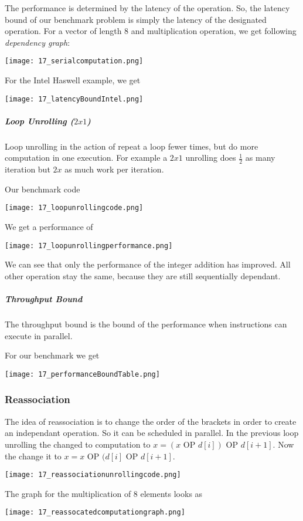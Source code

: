 The performance is determined by the latency of the operation. So, the latency bound of our benchmark problem is simply the latency of the designated operation. For a vector of length $8$ and multiplication operation, we get following \textit{dependency graph}:

\texttt{[image: 17\_serialcomputation.png]}

For the Intel Haswell example, we get

\texttt{[image: 17\_latencyBoundIntel.png]}

\subparagraph{Loop Unrolling ($2x1$)}
Loop unrolling in the action of repeat a loop fewer times, but do more computation in one execution. For example a $2x1$ unrolling does $\frac{1}{2}$ as many iteration but $2x$ as much work per iteration.

Our benchmark code

\texttt{[image: 17\_loopunrollingcode.png]}

We get a performance of 

\texttt{[image: 17\_loopunrollingperformance.png]}

We can see that only the performance of the integer addition has improved. All other operation stay the same, because they are still sequentially dependant.


\subparagraph{Throughput Bound}
The throughput bound is the bound of the performance when instructions can execute in parallel.

For our benchmark we get

\texttt{[image: 17\_performanceBoundTable.png]}

\subsubsection{Reassociation}
The idea of reassociation is to change the order of the brackets in order to create an independant operation. So it can be scheduled in parallel. In the previous loop unrolling the changed to computation to $x = (x \text{ OP } d[i]) \text{ OP } d[i + 1]$. Now the change it to $x = x \text{ OP } (d[i] \text{ OP } d[i + 1]$.

\texttt{[image: 17\_reassociationunrollingcode.png]}

The graph for the multiplication of $8$ elements looks as

\texttt{[image: 17\_reassocatedcomputationgraph.png]}



